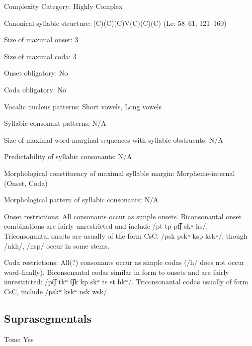 {\begin{appendixdesc}
\item[Complexity Category:] Highly Complex

\item[Canonical syllable structure:] (C)(C)(C)V(C)(C)(C) (Le\citealt{Sourd1993}: 58--61, 121--160)

\item[Size of maximal onset:] 3

\item[Size of maximal coda:] 3

\item[Onset obligatory:] No

\item[Coda obligatory:] No

\item[Vocalic nucleus patterns:] Short vowels, Long vowels

\item[Syllabic consonant patterns:] N/A

\item[Size of maximal word-marginal sequences with syllabic obstruents:] N/A

\item[Predictability of syllabic consonants:] N/A

\item[Morphological constituency of maximal syllable margin:] Morpheme-internal (Onset, Coda)

\item[Morphological pattern of syllabic consonants:] N/A

\item[Onset restrictions:] All consonants occur as simple onsets. Biconsonantal onset combinations are fairly unrestricted and include /pt tp pt͡ʃ skʷ hs/. Triconsonantal onsets are usually of the form CsC: /psk pskʷ ksp kskʷ/, though /nkh/, /nsp/ occur in some stems.

\item[Coda restrictions:] All(?) consonants occur as simple codas (/h/ does not occur word-finally). Biconsonantal codas similar in form to onsets and are fairly unrestricted: /pt͡ʃ tkʷ t͡ʃk kp skʷ ts st hkʷ/. Triconsonantal codas usually of form CsC, include /pskʷ kskʷ nsk wsk/.
\end{appendixdesc}
\subsection*{Suprasegmentals}
\begin{appendixdesc}
\item[Tone:] Yes


\end{appendixdesc}}
